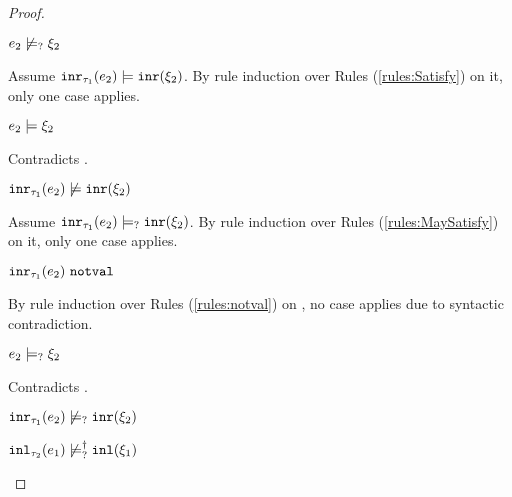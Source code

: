\begin{proof}
\begin{byCases}
\begin{byCases}
\begin{byCases}
\begin{pfsteps*}
            \item $e_2 \not\models_{?} \xi_2$  
            \end{pfsteps*}
            Assume $\mathtt{inr}_{\tau_1}({e_2}) \models \mathtt{inr}(\xi_2)$. By rule induction over Rules (\ref{rules:Satisfy}) on it, only one case applies.
            \begin{byCases}
            \item[\text{(\ref{rule:CSInr})}]
                \begin{pfsteps*}
                \item $e_2 \models \xi_2$
                \end{pfsteps*}
                Contradicts .
            \end{byCases}
            \begin{pfsteps*}
            \item $\mathtt{inr}_{\tau_1}({e_2}) \not\models \mathtt{inr}(\xi_2)$  
            \end{pfsteps*}
            Assume $\mathtt{inr}_{\tau_1}({e_2}) \models_{?} \mathtt{inr}(\xi_2)$. By rule induction over Rules (\ref{rules:MaySatisfy}) on it, only one case applies.
            \begin{byCases}
            \item[\text{(\ref{rule:CMSNotVal})}]
                \begin{pfsteps*}
                \item $\mathtt{inr}_{\tau_1}({e_2}) ~\mathtt{notval}$  
                \end{pfsteps*}
                By rule induction over Rules (\ref{rules:notval}) on , no case applies due to syntactic contradiction.
            \item[\text{(\ref{rule:CMSInr})}]
                \begin{pfsteps*}
                \item $e_2 \models_{?} \xi_2$
                \end{pfsteps*}
                Contradicts .
            \end{byCases}
            \begin{pfsteps*}
            \item $\mathtt{inr}_{\tau_1}({e_2}) \not\models_{?} \mathtt{inr}(\xi_2)$  
            \item $\mathtt{inl}_{\tau_2}({e_1}) \not\models_{?}^{\dag} \mathtt{inl}(\xi_1)$ 
            \end{pfsteps*}
        \end{byCases}
    \end{byCases}


\end{byCases}
\end{proof}
